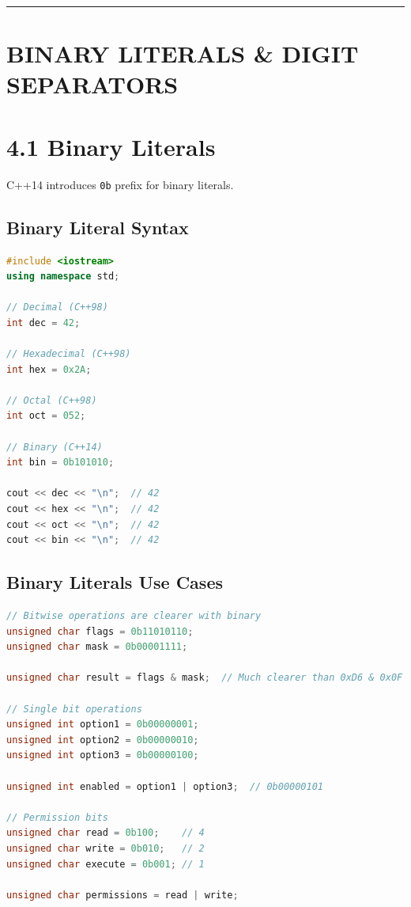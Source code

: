 \begin{center}\rule{0.5\linewidth}{0.5pt}\end{center}

\hypertarget{binary-literals-digit-separators}{%
\section{BINARY LITERALS \& DIGIT
SEPARATORS}\label{binary-literals-digit-separators}}

\hypertarget{binary-literals}{%
\section{4.1 Binary Literals}\label{binary-literals}}

C++14 introduces \passthrough{\lstinline!0b!} prefix for binary
literals.

\hypertarget{binary-literal-syntax}{%
\subsection{Binary Literal Syntax}\label{binary-literal-syntax}}

\begin{lstlisting}[language={C++}]
#include <iostream>
using namespace std;

// Decimal (C++98)
int dec = 42;

// Hexadecimal (C++98)
int hex = 0x2A;

// Octal (C++98)
int oct = 052;

// Binary (C++14)
int bin = 0b101010;

cout << dec << "\n";  // 42
cout << hex << "\n";  // 42
cout << oct << "\n";  // 42
cout << bin << "\n";  // 42
\end{lstlisting}

\hypertarget{binary-literals-use-cases}{%
\subsection{Binary Literals Use Cases}\label{binary-literals-use-cases}}

\begin{lstlisting}[language={C++}]
// Bitwise operations are clearer with binary
unsigned char flags = 0b11010110;
unsigned char mask = 0b00001111;

unsigned char result = flags & mask;  // Much clearer than 0xD6 & 0x0F

// Single bit operations
unsigned int option1 = 0b00000001;
unsigned int option2 = 0b00000010;
unsigned int option3 = 0b00000100;

unsigned int enabled = option1 | option3;  // 0b00000101

// Permission bits
unsigned char read = 0b100;    // 4
unsigned char write = 0b010;   // 2
unsigned char execute = 0b001; // 1

unsigned char permissions = read | write;
\end{lstlisting}

